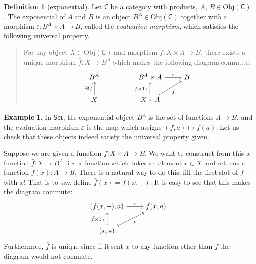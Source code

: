 \documentclass[a4paper]{report}
\newcommand{\defn}[1]{\ul{#1}}
\newcommand{\Obj}{\mathrm{Obj}}
\theoremstyle{definition}
\newtheorem{definition}{Definition}[section]
\newtheorem{example}{Example}[section]
\theoremstyle{plain}
\theoremstyle{remark}
\begin{document}
\begin{definition}[exponential]
  \label{def:exponential}
  Let $\mathsf{C}$ be a category with products, $A$, $B \in \Obj(\mathsf{C})$. The \defn{exponential} of $A$ and $B$ is an object $B^{A} \in \Obj(\mathsf{C})$ together with a morphism $\varepsilon\colon B^{A} \times A \to B$, called the \emph{evaluation morphism}, which satisfies the following universal property.

  \begin{quote}
    For any object $X \in \Obj(\mathsf{C})$ and morphism $f\colon X \times A \to B$, there exists a unique morphism $\bar{f}\colon X \to B^{A}$ which makes the following diagram commute.
    \begin{equation*}
      \begin{tikzcd}
        B^{A}
        & & B^{A} \times A
        \arrow[r, "\varepsilon"]
        & B
        \\
        X 
        \arrow[u, "\exists!\bar{f}"]
        & & X \times A
        \arrow[ur, swap, "f"]
        \arrow[u, "\bar{f} \times 1_{A}"]
      \end{tikzcd}
    \end{equation*}
  \end{quote}
\end{definition}

\begin{example}
  In $\mathsf{Set}$, the exponential object $B^{A}$ is the set of functions $A \to B$, and the evaluation morphism $\varepsilon$ is the map which assigns $(f, a) \mapsto f(a)$. Let us check that these objects indeed satisfy the universal property given.

  Suppose we are given a function $f\colon X \times A \to B$. We want to construct from this a function $\bar{f}\colon X \to B^{A}$. i.e. a function which takes an element $x \in X$ and returns a function $\bar{f}(x)\colon A \to B$. There is a natural way to do this: fill the first slot of $f$ with $x$! That is to say, define $\bar{f}(x) = f(x, -)$. It is easy to see that this makes the diagram commute:
  \begin{equation*}
    \begin{tikzcd}
      {(f(x,-), a)}
      \arrow[r, mapsto, "\varepsilon"]
      &{f(x, a)}
      \\
      {(x, a)}
      \arrow[u, mapsto, "\bar{f} \times 1_{A}"]
      \arrow[ur, mapsto, swap, "f"]
    \end{tikzcd}
  \end{equation*}
  Furthermore, $\bar{f}$ is unique since if it sent $x$ to any function other than $f$ the diagram would not commute.
\end{example}
\end{document}
